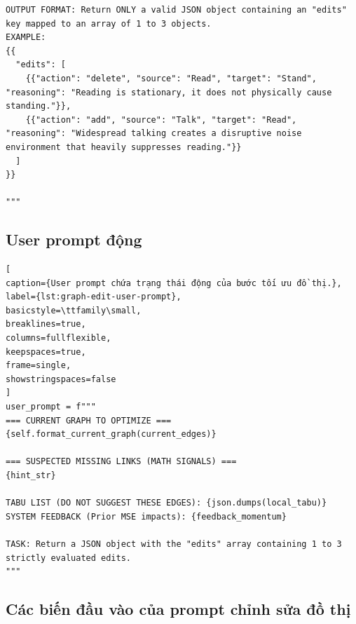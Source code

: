 \begin{lstlisting}
OUTPUT FORMAT: Return ONLY a valid JSON object containing an "edits" key mapped to an array of 1 to 3 objects.
EXAMPLE:
{{
  "edits": [
    {{"action": "delete", "source": "Read", "target": "Stand", "reasoning": "Reading is stationary, it does not physically cause standing."}},
    {{"action": "add", "source": "Talk", "target": "Read", "reasoning": "Widespread talking creates a disruptive noise environment that heavily suppresses reading."}}
  ]
}}

"""
\end{lstlisting}

\subsection{User prompt động}

\begin{lstlisting}[
caption={User prompt chứa trạng thái động của bước tối ưu đồ thị.},
label={lst:graph-edit-user-prompt},
basicstyle=\ttfamily\small,
breaklines=true,
columns=fullflexible,
keepspaces=true,
frame=single,
showstringspaces=false
]
user_prompt = f"""
=== CURRENT GRAPH TO OPTIMIZE ===
{self.format_current_graph(current_edges)}

=== SUSPECTED MISSING LINKS (MATH SIGNALS) ===
{hint_str}

TABU LIST (DO NOT SUGGEST THESE EDGES): {json.dumps(local_tabu)}
SYSTEM FEEDBACK (Prior MSE impacts): {feedback_momentum}

TASK: Return a JSON object with the "edits" array containing 1 to 3 strictly evaluated edits.
"""
\end{lstlisting}

\subsection{Các biến đầu vào của prompt chỉnh sửa đồ thị}

